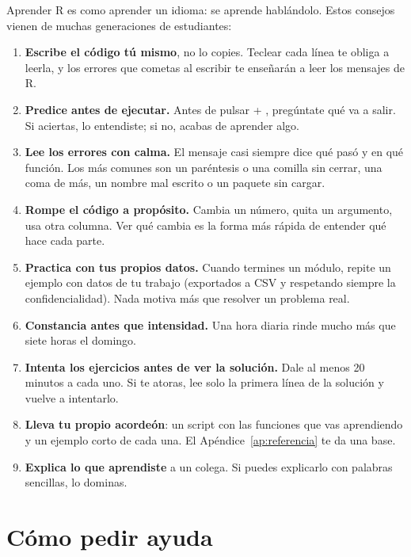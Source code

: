Aprender R es como aprender un idioma: se aprende hablándolo. Estos
consejos vienen de muchas generaciones de estudiantes:

\begin{enumerate}
  \item \textbf{Escribe el código tú mismo}, no lo copies. Teclear cada
        línea te obliga a leerla, y los errores que cometas al escribir te
        enseñarán a leer los mensajes de R.
  \item \textbf{Predice antes de ejecutar.} Antes de pulsar  +
        , pregúntate qué va a salir. Si aciertas, lo
        entendiste; si no, acabas de aprender algo.
  \item \textbf{Lee los errores con calma.} El mensaje casi siempre dice qué
        pasó y en qué función. Los más comunes son un paréntesis o una
        comilla sin cerrar, una coma de más, un nombre mal escrito o un
        paquete sin cargar.
  \item \textbf{Rompe el código a propósito.} Cambia un número, quita un
        argumento, usa otra columna. Ver qué cambia es la forma más rápida
        de entender qué hace cada parte.
  \item \textbf{Practica con tus propios datos.} Cuando termines un módulo,
        repite un ejemplo con datos de tu trabajo (exportados a CSV y
        respetando siempre la confidencialidad). Nada motiva más que
        resolver un problema real.
  \item \textbf{Constancia antes que intensidad.} Una hora diaria rinde
        mucho más que siete horas el domingo.
  \item \textbf{Intenta los ejercicios antes de ver la solución.} Dale al
        menos 20 minutos a cada uno. Si te atoras, lee solo la primera
        línea de la solución y vuelve a intentarlo.
  \item \textbf{Lleva tu propio acordeón}: un script con las funciones que
        vas aprendiendo y un ejemplo corto de cada una. El
        Apéndice~\ref{ap:referencia} te da una base.
  \item \textbf{Explica lo que aprendiste} a un colega. Si puedes
        explicarlo con palabras sencillas, lo dominas.
\end{enumerate}

\section{Cómo pedir ayuda}
\label{sec:m0-ayuda}

